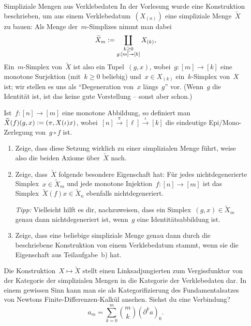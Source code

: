 \documentclass{uebblatt}
\begin{document}
\begin{aufgabe}{Simpliziale Mengen aus Verklebedaten}
In der Vorlesung wurde eine Konstruktion beschrieben, um aus einem
Verklebedatum~$(X_{(n)})$ eine simpliziale Menge~$\widetilde X$ zu bauen: Als
Menge der~$m$-Simplizes nimmt man dabei
\[ \widetilde X_m \vcentcolon= \coprod_{\substack{k \geq 0 \\ g : [m] \twoheadrightarrow [k]}} X_{(k)}, \]
Ein~$m$-Simplex von~$\widetilde X$ ist also ein Tupel~$(g,x)$, wobei~$g : [m]
\to [k]$ eine monotone Surjektion (mit~$k \geq 0$ beliebig) und~$x \in X_{(k)}$
ein~$k$-Simplex von~$X$ ist; wir stellen es uns als "`Degeneration von~$x$
längs~$g$"' vor. (Wenn~$g$ die Identität ist, ist das keine gute Vorstellung --
sonst aber schon.)

Ist~$f : [n] \to [m]$ eine monotone Abbildung, so definiert
man~$\widetilde X(f)(g,x) \vcentcolon= (\pi, X(\iota)x)$, wobei~$[n]
\xrightarrow{\pi} [\ell] \xrightarrow{\iota} [k]$ die eindeutige Epi/Mono-Zerlegung
von~$g \circ f$ ist.
\begin{enumerate}
\item Zeige, dass diese Setzung wirklich zu einer simplizialen Menge führt,
weise also die beiden Axiome über~$\widetilde X$ nach.
\item Zeige, dass~$\widetilde X$ folgende besondere Eigenschaft hat: Für jedes
nichtdegenerierte Simplex~$x \in \widetilde X_m$ und jede monotone Injektion~$f
: [n] \to [m]$ ist das Simplex~$\widetilde X(f)x \in \widetilde X_n$
ebenfalls nichtdegeneriert.

{\tiny\emph{Tipp:} Vielleicht hilft es dir, nachzuweisen, dass ein Simplex~$(g,x) \in
\widetilde X_m$ genau dann nichtdegeneriert ist, wenn~$g$ eine
Identitätsabbildung ist.\par}

\item Zeige, dass eine beliebige simpliziale Menge genau dann durch die
beschriebene Konstruktion von einem Verklebedatum stammt, wenn sie die
Eigenschaft aus Teilaufgabe~b) hat.
\end{enumerate}

\begin{tiny}
Die Konstruktion~$X \mapsto \widetilde X$ stellt einen Linksadjungierten zum
Vergissfunktor von der Kategorie der simplizialen Mengen in die Kategorie der
Verklebedaten dar. In einem gewissen Sinn kann man sie als Kategorifizierung
des Fundamentalsatzes von Newtons Finite-Differenzen-Kalkül ansehen.
Siehst du eine Verbindung?
\[ a_m = \sum_{k=0}^m \binom{m}{k} (\partial^k a)_0. \]
\end{tiny}
\end{aufgabe}
\end{document}
